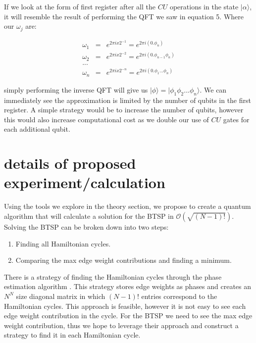\documentclass[twocolumn,showpacs,preprintnumbers,amsmath,amssymb]{revtex4}
\begin{document}
		If we look at the form of first register after all the $CU$ operations in the state $|\alpha\rangle$, it will resemble the result of performing the QFT we saw in equation 5. Where our $\omega_j$ are:
		
		\begin{eqnarray*}
			\omega_1 &=& e^{2\pi i x 2^{-1}} =  e^{2\pi i (0.\phi_n)}\\
			\omega_2 &=& e^{2\pi i x 2^{-2}} =  e^{2\pi i (0.\phi_{n-1}\phi_n)}\\
			...\\
			\omega_n &=& e^{2\pi i x 2^{-n}} =  e^{2\pi i (0.\phi_1...\phi_n)}
		\end{eqnarray*}
		
		simply performing the inverse QFT will give us $|\phi\rangle =  |\phi_1\phi_2 ... \phi_n\rangle$.  We can immediately see the approximation is limited by the number of qubits in the first register. A simple strategy would be to increase the number of qubits, however this would also increase computational cost as we double our use of $CU$ gates for each additional qubit.
		
		
		
		
		
		
		\section{details of proposed experiment/calculation}
		
		
		Using the tools we explore in the theory section, we propose to create a quantum algorithm that will calculate a solution for the BTSP in $\mathcal{O}(\sqrt{(N-1)!})$. Solving the BTSP can be broken down into two steps:
		
		\begin{enumerate}
			\item Finding all Hamiltonian cycles.
			\item Comparing the max edge weight contributions and finding a minimum.
		\end{enumerate}
		
		There is a strategy of finding the Hamiltonian cycles through the phase estimation algorithm \cite{srinivasan2018efficient}. This strategy stores edge weights as phases and creates an $N^N$ size diagonal matrix in which $(N-1)!$ entries correspond to the Hamiltonian cycles. This approach is feasible, however it is not easy to see each edge weight contribution in the cycle. For the BTSP we need to see the max edge weight contribution, thus we hope to leverage their approach and construct a strategy to find it in each Hamiltonian cycle.
		
\end{document}

